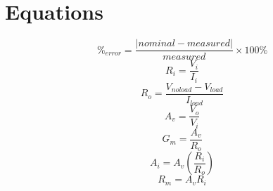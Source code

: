 \documentclass{article}
\begin{document}
\section*{Equations}

\[\%_{error} = \frac{|nominal - measured|}{measured} \times 100\%\]
\[R_i = \frac{V_i}{I_i}\]
\[R_o = \frac{V_{noload} - V_{load}}{I_{load}}\]
\[A_v = \frac{V_o}{V_i}\]
\[G_m = \frac{A_v}{R_o}\]
\[A_i = A_v \left(\frac{R_i}{R_o}\right)\]
\[R_m = A_v R_i\]
\end{document}
